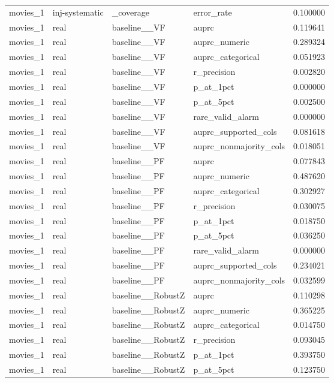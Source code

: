 \begin{tabular}{lllll}
movies\_1 & inj-systematic & \_coverage & error\_rate & 0.100000 \\
movies\_1 & real & baseline\_\_VF & auprc & 0.119641 \\
movies\_1 & real & baseline\_\_VF & auprc\_numeric & 0.289324 \\
movies\_1 & real & baseline\_\_VF & auprc\_categorical & 0.051923 \\
movies\_1 & real & baseline\_\_VF & r\_precision & 0.002820 \\
movies\_1 & real & baseline\_\_VF & p\_at\_1pct & 0.000000 \\
movies\_1 & real & baseline\_\_VF & p\_at\_5pct & 0.002500 \\
movies\_1 & real & baseline\_\_VF & rare\_valid\_alarm & 0.000000 \\
movies\_1 & real & baseline\_\_VF & auprc\_supported\_cols & 0.081618 \\
movies\_1 & real & baseline\_\_VF & auprc\_nonmajority\_cols & 0.018051 \\
movies\_1 & real & baseline\_\_PF & auprc & 0.077843 \\
movies\_1 & real & baseline\_\_PF & auprc\_numeric & 0.487620 \\
movies\_1 & real & baseline\_\_PF & auprc\_categorical & 0.302927 \\
movies\_1 & real & baseline\_\_PF & r\_precision & 0.030075 \\
movies\_1 & real & baseline\_\_PF & p\_at\_1pct & 0.018750 \\
movies\_1 & real & baseline\_\_PF & p\_at\_5pct & 0.036250 \\
movies\_1 & real & baseline\_\_PF & rare\_valid\_alarm & 0.000000 \\
movies\_1 & real & baseline\_\_PF & auprc\_supported\_cols & 0.234021 \\
movies\_1 & real & baseline\_\_PF & auprc\_nonmajority\_cols & 0.032599 \\
movies\_1 & real & baseline\_\_RobustZ & auprc & 0.110298 \\
movies\_1 & real & baseline\_\_RobustZ & auprc\_numeric & 0.365225 \\
movies\_1 & real & baseline\_\_RobustZ & auprc\_categorical & 0.014750 \\
movies\_1 & real & baseline\_\_RobustZ & r\_precision & 0.093045 \\
movies\_1 & real & baseline\_\_RobustZ & p\_at\_1pct & 0.393750 \\
movies\_1 & real & baseline\_\_RobustZ & p\_at\_5pct & 0.123750 \\

\end{tabular}
